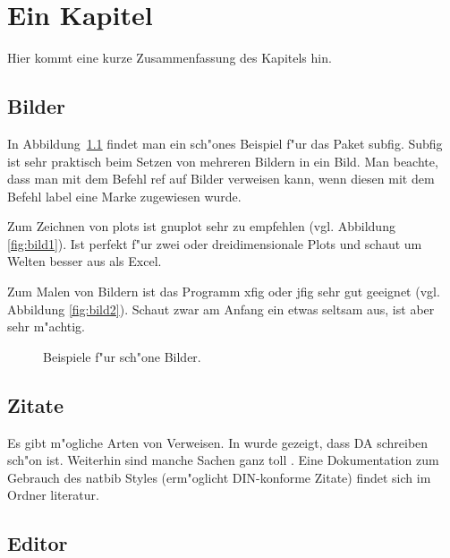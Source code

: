 \chapter{Ein Kapitel}
\label{cha:grafiken}
Hier kommt eine kurze Zusammenfassung des Kapitels hin. 

\section{Bilder}
\label{sec:bilder}

In Abbildung~\ref{fig:bild1-und-bild2} findet man ein sch"ones Beispiel f"ur das  Paket subfig. Subfig ist sehr praktisch beim Setzen von mehreren Bildern in ein Bild. Man beachte, dass man mit dem Befehl ref auf Bilder verweisen kann, wenn diesen mit dem Befehl label eine Marke zugewiesen wurde.


Zum Zeichnen von plots ist gnuplot sehr zu empfehlen (vgl. Abbildung \ref{fig:bild1}). Ist perfekt f"ur zwei oder dreidimensionale Plots und schaut um Welten besser aus als Excel.

Zum Malen von Bildern ist das Programm xfig oder jfig sehr gut geeignet (vgl. Abbildung \ref{fig:bild2}). Schaut zwar am Anfang ein etwas seltsam aus, ist aber sehr m"achtig.

\begin{figure}
\centering
{}
\caption[Das hier steht im Abbildungsverzeichnis.]{Beispiele f"ur sch"one Bilder.\label{fig:bild1-und-bild2}}

\end{figure}

\section{Zitate}

Es gibt m"ogliche Arten von Verweisen.
In \citet[S. 120]{kotz} wurde gezeigt, dass DA schreiben sch"on ist.
Weiterhin sind manche Sachen ganz toll  \citep[S. 120]{kotz}. Eine Dokumentation zum Gebrauch des natbib Styles (erm"oglicht DIN-konforme Zitate) findet sich im Ordner literatur.


\section{Editor}

